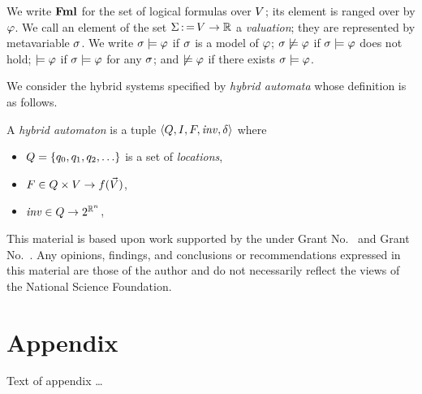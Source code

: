 \documentclass[acmsmall,review,anonymous]{acmart}\settopmatter{printfolios=true,printccs=false,printacmref=false}
\begin{document}
We write $\mathbf{Fml}$ for the set of logical formulas over $V$; its
element is ranged over by $\varphi$.   We call
an element of the set $\Sigma \operatorname{{:=}} V \rightarrow \mathbb{R}$ a
\emph{valuation}; they are represented by metavariable $\sigma$.
We write $\sigma \models \varphi$ if $\sigma$ is a model of
$\varphi$; $\sigma \not\models \varphi$ if $\sigma \models \varphi$ does
not hold; $\models \varphi$ if $\sigma \models \varphi$ for any
$\sigma$; and $\not\models \varphi$ if there exists
$\sigma \models \varphi$.

We consider the hybrid systems specified by \emph{hybrid automata}
whose definition is as follows.
\begin{definition}
  A \emph{hybrid automaton} is a tuple
  $\left\langle {Q,I,F,\mathit{inv},\delta} \right\rangle$ where
  \begin{itemize}
  \item $Q = \left\{{q_0,q_1,q_2,\dots}\right\}$ is a set of
    \emph{locations},
  \item $F \in Q \times V \rightarrow f(\vec{V})$,
  \item $\mathit{inv} \in Q \rightarrow 2^{\mathbb{R}^n}$,
  \end{itemize}
\end{definition}

\begin{acks}                            %
  This material is based upon work supported by the
   under Grant
  No.~ and Grant
  No.~.  Any opinions, findings, and
  conclusions or recommendations expressed in this material are those
  of the author and do not necessarily reflect the views of the
  National Science Foundation.
\end{acks}





\appendix
\section{Appendix}

Text of appendix \ldots
\end{document}
